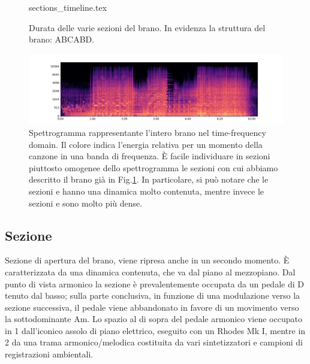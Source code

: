 \documentclass[class=book, crop=false, oneside, 12pt]{standalone}
\begin{document}
    \begin{figure}[htb]
        \centering
        {sections_timeline.tex}
        \caption[Durata delle varie sezioni del brano.]{Durata delle varie sezioni del brano. In evidenza la struttura del brano: ABCABD.}
        \label{fig:04-sections-timeline}
    \end{figure}

    \begin{figure}[htb]
        \centering
        \includegraphics[width=\textwidth]{sheep_spectrogram.png}
        \caption[Spettrogramma rappresentante l'intero brano nel time-frequency domain.]{Spettrogramma rappresentante l'intero brano nel time-frequency domain. Il colore indica l'energia relativa per un momento della canzone in una banda di frequenza. È facile individuare in sezioni piuttosto omogenee dello spettrogramma le sezioni con cui abbiamo descritto il brano già in Fig.\ref{fig:04-sections-timeline}. In particolare, si può notare che  le sezioni  e  hanno una dinamica molto contenuta, mentre invece le sezioni  e  sono molto più dense.}
        \label{fig:sheep-spectrogram}
    \end{figure}

    \subsection{Sezione }
    Sezione di apertura del brano, viene ripresa anche in un secondo momento. È caratterizzata da una dinamica contenuta, che va dal piano al mezzopiano. Dal punto di vista armonico la sezione è prevalentemente occupata da un pedale di D tenuto dal basso; sulla parte conclusiva, in funzione di una modulazione verso la sezione successiva, il pedale viene abbandonato in favore di un movimento verso la sottodominante Am. Lo spazio al di sopra del pedale armonico viene occupato in 1 dall'iconico assolo di piano elettrico, eseguito con un Rhodes Mk I, mentre in 2 da una trama armonico/melodica costituita da vari sintetizzatori e campioni di registrazioni ambientali.
\end{document}
